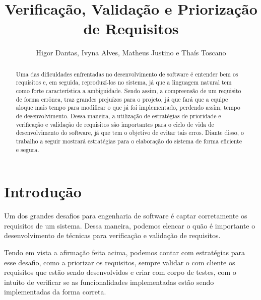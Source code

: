 \documentclass[runningheads]{llncs}
\begin{document}
%
\title{Verificação, Validação e Priorização de Requisitos}
%
\author{Higor Dantas,
Ivyna Alves, Matheus Justino e
Thaís Toscano}
%
%
%
\maketitle              %
%
\begin{abstract}
Uma das dificuldades enfrentadas no desenvolvimento de software é entender bem os requisitos e, em seguida, reproduzí-los no sistema, já que a linguagem natural tem como forte característica a ambiguidade. Sendo assim, a compreensão de um requisito de forma errônea, traz grandes prejuízos para o projeto, já que fará que a equipe aloque mais tempo para modificar o que já foi implementado, perdendo assim, tempo de desenvolvimento. Dessa maneira, a utilização de estratégias de prioridade e verificação e validação de requisitos são importantes para o ciclo de vida de desenvolvimento do software, já que tem o objetivo de evitar tais erros. Diante disso, o trabalho a seguir mostrará estratégias para o elaboração do sistema de forma eficiente e segura.

\end{abstract}
%
%
%
\section{Introdução}
Um dos grandes desafios para engenharia de software é captar corretamente os requisitos de um sistema. Dessa maneira, podemos elencar o quão é importante o desenvolvimento de técnicas para verificação e validação de requisitos.

Tendo em vista a afirmação feita acima, podemos contar com estratégias para esse desafio, como a priorizar os requisitos, sempre validar o com cliente os requisitos que estão sendo desenvolvidos e criar com corpo de testes, com o intuito de verificar se as funcionalidades implementadas estão sendo implementadas da forma correta.
\end{document}
